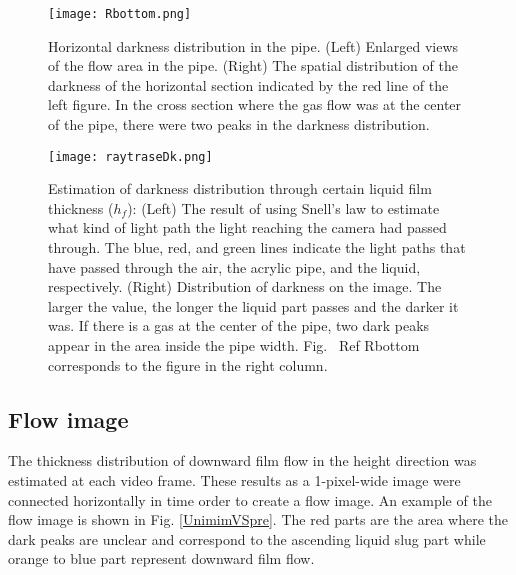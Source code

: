 \documentclass[aps,pre,preprint,groupedaddress,showkeys]{revtex4-2}
\begin{document}
\begin{figure}
\texttt{[image: Rbottom.png]} 
\caption{\label{Rbottom} Horizontal darkness distribution in the pipe.
(Left) Enlarged views of the flow area in the pipe.
(Right) The spatial distribution of the darkness of the horizontal section indicated by the red line of the left figure.
In the cross section where the gas flow was at the center of the pipe, there were two peaks in the darkness distribution.}
\end{figure}

\begin{figure}
\texttt{[image: raytraseDk.png]} 
\caption{\label{raytraseDk}Estimation of darkness distribution through certain liquid film thickness ($ h_f $):
(Left) The result of using Snell's law to estimate what kind of light path the light reaching the camera had passed through.
The blue, red, and green lines indicate the light paths that have passed through the air, the acrylic pipe, and the liquid, respectively.
(Right) Distribution of darkness on the image.
The larger the value, the longer the liquid part passes and the darker it was.
If there is a gas at the center of the pipe, two dark peaks appear in the area inside the pipe width.
Fig. \ Ref {Rbottom} corresponds to the figure in the right column.}
\end{figure}

\subsection{Flow image}\label{flowim}
The thickness distribution of downward film flow in the height direction was estimated at each video frame.
These results as a 1-pixel-wide image were connected horizontally in time order to create a flow image.
An example of the flow image is shown in Fig. \ref{UnimimVSpre}. 
The red parts are the area where the dark peaks are unclear and correspond to the ascending liquid slug part while orange to blue part represent downward film flow.
\end{document}
